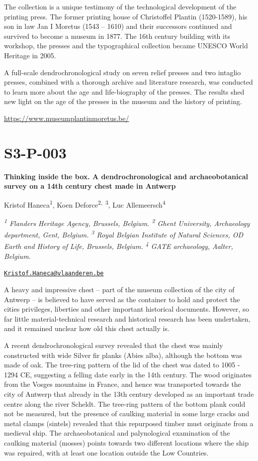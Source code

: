 \documentclass[
]{book}
\begin{document}
The collection is a unique testimony of the technological development of the printing press. The former printing house of Christoffel Plantin (1520-1589), his son in law Jan I Moretus (1543 -- 1610) and their successors continued and survived to become a museum in 1877. The 16th century building with its workshop, the presses and the typographical collection became UNESCO World Heritage in 2005.

A full-scale dendrochronological study on seven relief presses and two intaglio presses, combined with a thorough archive and literature research, was conducted to learn more about the age and life-biography of the presses. The results shed new light on the age of the presses in the museum and the history of printing.

\url{https://www.museumplantinmoretus.be/}

\hypertarget{s3-p-003}{%
\section*{S3-P-003}\label{s3-p-003}}

\textbf{Thinking inside the box. A dendrochronological and archaeobotanical survey on a 14th century chest made in Antwerp}

Kristof Haneca\textsuperscript{1}, Koen Deforce\textsuperscript{2,~3}, Luc Allemeersch\textsuperscript{4}

\emph{\textsuperscript{1} Flanders Heritage Agency, Brussels, Belgium. \textsuperscript{2} Ghent University, Archaeology department, Gent, Belgium. \textsuperscript{3} Royal Belgian Institute of Natural Sciences, OD Earth and History of Life, Brussels, Belgium. \textsuperscript{4} GATE archaeology, Aalter, Belgium.}

\href{mailto:Kristof.Haneca@vlaanderen.be}{\nolinkurl{Kristof.Haneca@vlaanderen.be}}

A heavy and impressive chest -- part of the museum collection of the city of Antwerp -- is believed to have served as the container to hold and protect the cities privileges, liberties and other important historical documents. However, so far little material-technical research and historical research has been undertaken, and it remained unclear how old this chest actually is.

A recent dendrochronological survey revealed that the chest was mainly constructed with wide Silver fir planks (Abies alba), although the bottom was made of oak. The tree-ring pattern of the lid of the chest was dated to 1005 - 1294 CE, suggesting a felling date early in the 14th century. The wood originates from the Vosges mountains in France, and hence was transported towards the city of Antwerp that already in the 13th century developed as an important trade centre along the river Scheldt. The tree-ring pattern of the bottom plank could not be measured, but the presence of caulking material in some large cracks and metal clamps (sintels) revealed that this repurposed timber must originate from a medieval ship. The archaeobotanical and palynological examination of the caulking material (mosses) points towards two different locations where the ship was repaired, with at least one location outside the Low Countries.
\end{document}
